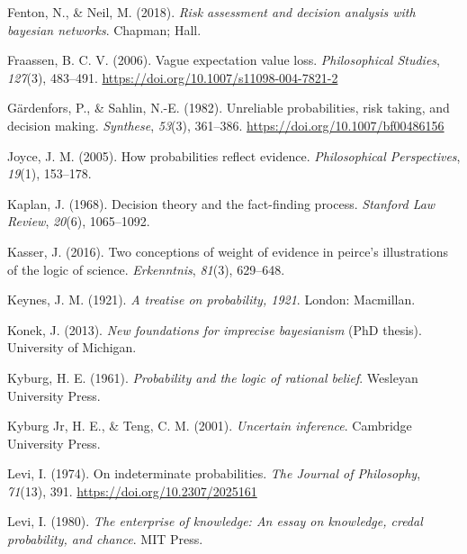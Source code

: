 \documentclass[
  10pt,
  dvipsnames,enabledeprecatedfontcommands]{scrartcl}
\newlength{\cslhangindent}
\newlength{\cslentryspacingunit} %
\newenvironment{CSLReferences}[2] %
 {%
  \setlength{\parindent}{0pt}
  \ifodd #1
  \let\oldpar\par
  \def\par{\hangindent=\cslhangindent\oldpar}
  \fi
  \setlength{\parskip}{#2\cslentryspacingunit}
 }%
 {}
\begin{document}
\begin{CSLReferences}{1}{0}
\leavevmode{}%
Fenton, N., \& Neil, M. (2018). \emph{Risk assessment and decision
analysis with bayesian networks}. Chapman; Hall.

\leavevmode{}%
Fraassen, B. C. V. (2006). Vague expectation value loss.
\emph{Philosophical Studies}, \emph{127}(3), 483--491.
\url{https://doi.org/10.1007/s11098-004-7821-2}

\leavevmode{}%
Gärdenfors, P., \& Sahlin, N.-E. (1982). Unreliable probabilities, risk
taking, and decision making. \emph{Synthese}, \emph{53}(3), 361--386.
\url{https://doi.org/10.1007/bf00486156}

\leavevmode{}%
Joyce, J. M. (2005). How probabilities reflect evidence.
\emph{Philosophical Perspectives}, \emph{19}(1), 153--178.

\leavevmode{}%
Kaplan, J. (1968). Decision theory and the fact-finding process.
\emph{Stanford Law Review}, \emph{20}(6), 1065--1092.

\leavevmode{}%
Kasser, J. (2016). Two conceptions of weight of evidence in peirce's
illustrations of the logic of science. \emph{Erkenntnis}, \emph{81}(3),
629--648.

\leavevmode{}%
Keynes, J. M. (1921). \emph{A treatise on probability, 1921}. London:
Macmillan.

\leavevmode{}%
Konek, J. (2013). \emph{New foundations for imprecise bayesianism} (PhD
thesis). University of Michigan.

\leavevmode{}%
Kyburg, H. E. (1961). \emph{Probability and the logic of rational
belief}. Wesleyan University Press.

\leavevmode{}%
Kyburg Jr, H. E., \& Teng, C. M. (2001). \emph{Uncertain inference}.
Cambridge University Press.

\leavevmode{}%
Levi, I. (1974). On indeterminate probabilities. \emph{The Journal of
Philosophy}, \emph{71}(13), 391. \url{https://doi.org/10.2307/2025161}

\leavevmode{}%
Levi, I. (1980). \emph{The enterprise of knowledge: An essay on
knowledge, credal probability, and chance}. MIT Press.


\end{CSLReferences}
\end{document}
